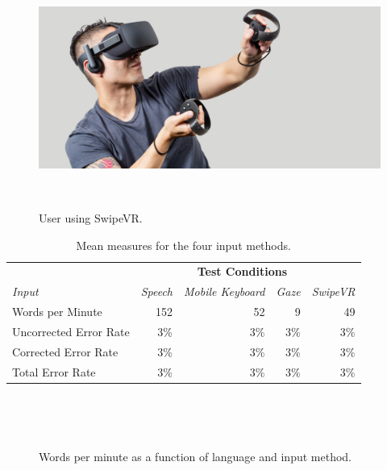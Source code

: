 \documentclass{sigchi}
\begin{document}
\begin{figure}
  \centering
  \includegraphics[width=1\columnwidth]{figures/manVR}
  \caption{User using SwipeVR.}~\label{fig:figure2}
\end{figure}


\begin{table}
  \centering
  \begin{tabular}{l r r r r}
    & & \multicolumn{2}{c}{\small{\textbf{Test Conditions}}} \\
    \cmidrule(r){2-5}
    {\small\textit{Input}}
    & {\small \textit{Speech}}
    & {\small \textit{Mobile Keyboard}}
    & {\small \textit{Gaze}}
    & {\small \textit{SwipeVR}} \\
    \midrule
    Words per Minute & 152 & 52 & 9 & 49 \\
    Uncorrected Error Rate & 3\% & 3\% & 3\% & 3\% \\
    Corrected Error Rate & 3\% & 3\% & 3\% & 3\%\\
    Total Error Rate & 3\% & 3\% & 3\% & 3\%\\
  \end{tabular}
  \caption{ Mean measures for the four input methods.}~\label{tab:tableResults}
\end{table}

\begin{figure}
\centering
{}

\caption{Words per minute as a function of language and input method.}~\label{fig:graphWPM}
\end{figure}
\end{document}
